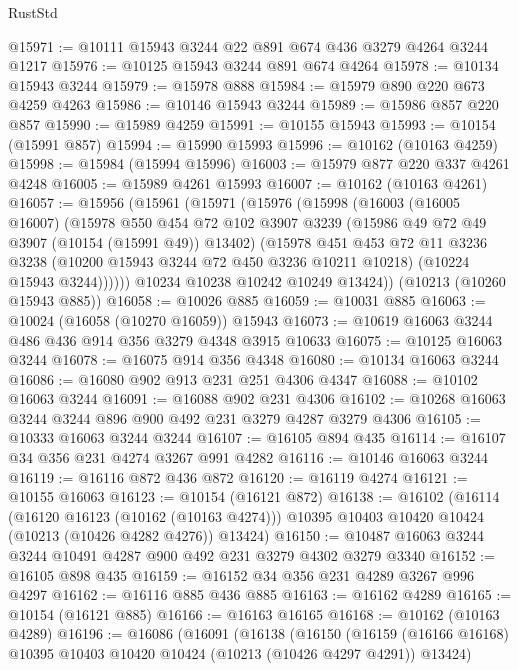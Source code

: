 \begin{lexlean}{RustStd}
\begin{coremodule}
@15971 := @10111 @15943 @3244 @22 @891 @674 @436 @3279 @4264 @3244 @1217
@15976 := @10125 @15943 @3244 @891 @674 @4264
@15978 := @10134 @15943 @3244
@15979 := @15978 @888
@15984 := @15979 @890 @220 @673 @4259 @4263
@15986 := @10146 @15943 @3244
@15989 := @15986 @857 @220 @857
@15990 := @15989 @4259
@15991 := @10155 @15943
@15993 := @10154 (@15991 @857)
@15994 := @15990 @15993
@15996 := @10162 (@10163 @4259)
@15998 := @15984 (@15994 @15996)
@16003 := @15979 @877 @220 @337 @4261 @4248
@16005 := @15989 @4261 @15993
@16007 := @10162 (@10163 @4261)
@16057 := @15956
    (@15961
      (@15971
        (@15976
          (@15998
            (@16003
              (@16005 @16007)
              (@15978
                @550
                @454
                @72
                @102
                @3907
                @3239
                (@15986 @49 @72 @49 @3907 (@10154 (@15991 @49)) @13402)
                (@15978
                  @451
                  @453
                  @72
                  @11
                  @3236
                  @3238
                  (@10200 @15943 @3244 @72 @450 @3236 @10211 @10218)
                  (@10224 @15943 @3244))))))
        @10234
        @10238
        @10242
        @10249
        @13424))
    (@10213 (@10260 @15943 @885))
@16058 := @10026 @885
@16059 := @10031 @885
@16063 := @10024 (@16058 (@10270 @16059)) @15943
@16073 := @10619 @16063 @3244 @486 @436 @914 @356 @3279 @4348 @3915 @10633
@16075 := @10125 @16063 @3244
@16078 := @16075 @914 @356 @4348
@16080 := @10134 @16063 @3244
@16086 := @16080 @902 @913 @231 @251 @4306 @4347
@16088 := @10102 @16063 @3244
@16091 := @16088 @902 @231 @4306
@16102 := @10268 @16063 @3244 @3244 @896 @900 @492 @231 @3279 @4287 @3279 @4306
@16105 := @10333 @16063 @3244 @3244
@16107 := @16105 @894 @435
@16114 := @16107 @34 @356 @231 @4274 @3267 @991 @4282
@16116 := @10146 @16063 @3244
@16119 := @16116 @872 @436 @872
@16120 := @16119 @4274
@16121 := @10155 @16063
@16123 := @10154 (@16121 @872)
@16138 := @16102
    (@16114
      (@16120 @16123 (@10162 (@10163 @4274)))
      @10395
      @10403
      @10420
      @10424
      (@10213 (@10426 @4282 @4276))
      @13424)
@16150 := @10487 @16063 @3244 @3244 @10491 @4287 @900 @492 @231 @3279 @4302 @3279 @3340
@16152 := @16105 @898 @435
@16159 := @16152 @34 @356 @231 @4289 @3267 @996 @4297
@16162 := @16116 @885 @436 @885
@16163 := @16162 @4289
@16165 := @10154 (@16121 @885)
@16166 := @16163 @16165
@16168 := @10162 (@10163 @4289)
@16196 := @16086
    (@16091
      (@16138
        (@16150
          (@16159 (@16166 @16168) @10395 @10403 @10420 @10424 (@10213 (@10426 @4297 @4291)) @13424)

\end{coremodule}
\end{lexlean}
